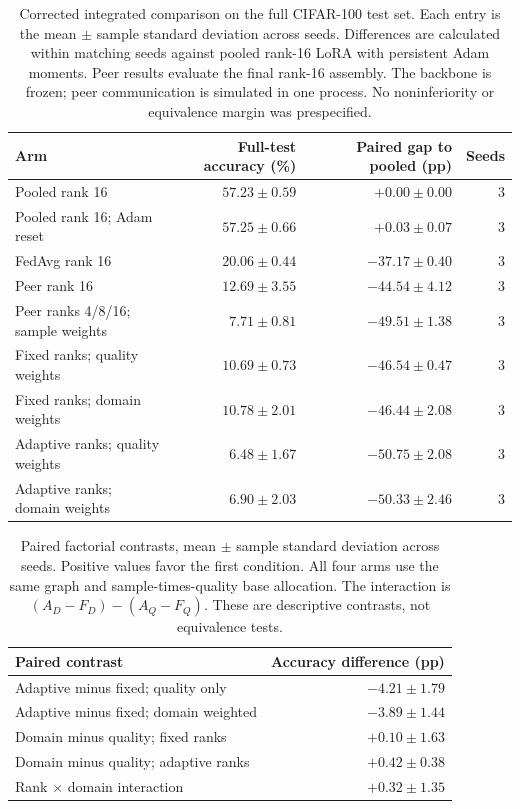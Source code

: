 \begin{table}[t]
\centering
\small
\begin{tabular}{lrrr}
\hline
Arm & Full-test accuracy (\%) & Paired gap to pooled (pp) & Seeds \\
\hline
Pooled rank 16 & $57.23 \pm 0.59$ & $+0.00 \pm 0.00$ & 3 \\
Pooled rank 16; Adam reset & $57.25 \pm 0.66$ & $+0.03 \pm 0.07$ & 3 \\
FedAvg rank 16 & $20.06 \pm 0.44$ & $-37.17 \pm 0.40$ & 3 \\
Peer rank 16 & $12.69 \pm 3.55$ & $-44.54 \pm 4.12$ & 3 \\
Peer ranks 4/8/16; sample weights & $7.71 \pm 0.81$ & $-49.51 \pm 1.38$ & 3 \\
Fixed ranks; quality weights & $10.69 \pm 0.73$ & $-46.54 \pm 0.47$ & 3 \\
Fixed ranks; domain weights & $10.78 \pm 2.01$ & $-46.44 \pm 2.08$ & 3 \\
Adaptive ranks; quality weights & $6.48 \pm 1.67$ & $-50.75 \pm 2.08$ & 3 \\
Adaptive ranks; domain weights & $6.90 \pm 2.03$ & $-50.33 \pm 2.46$ & 3 \\
\hline
\end{tabular}
\caption{Corrected integrated comparison on the full CIFAR-100 test set. Each entry is the mean $\pm$ sample standard deviation across seeds. Differences are calculated within matching seeds against pooled rank-16 LoRA with persistent Adam moments. Peer results evaluate the final rank-16 assembly. The backbone is frozen; peer communication is simulated in one process. No noninferiority or equivalence margin was prespecified.}
\label{tab:integrated-corrected}
\end{table}

\begin{table}[t]
\centering
\small
\begin{tabular}{lr}
\hline
Paired contrast & Accuracy difference (pp) \\
\hline
Adaptive minus fixed; quality only & $-4.21 \pm 1.79$ \\
Adaptive minus fixed; domain weighted & $-3.89 \pm 1.44$ \\
Domain minus quality; fixed ranks & $+0.10 \pm 1.63$ \\
Domain minus quality; adaptive ranks & $+0.42 \pm 0.38$ \\
Rank $\times$ domain interaction & $+0.32 \pm 1.35$ \\
\hline
\end{tabular}
\caption{Paired factorial contrasts, mean $\pm$ sample standard deviation across seeds. Positive values favor the first condition. All four arms use the same graph and sample-times-quality base allocation. The interaction is $(A_D-F_D)-(A_Q-F_Q)$. These are descriptive contrasts, not equivalence tests.}
\label{tab:integrated-factorial}
\end{table}
